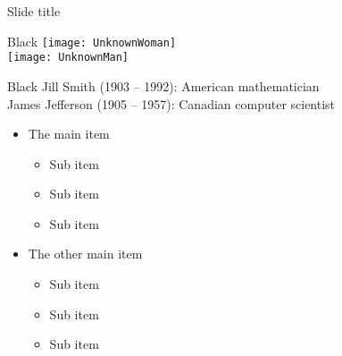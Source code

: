 \documentclass{MichiganTech}
\begin{document}
%
\begin{frame}[t]{Slide title}
  \vspace*{0.10in}
  \begin{reference}{108mm}{12mm}{Black}
    \texttt{[image: UnknownWoman]}\\
    \texttt{[image: UnknownMan]}
  \end{reference}
  \begin{reference}{4mm}{83mm}{Black}
    Jill Smith (1903 -- 1992): American mathematician\\
    James Jefferson (1905 -- 1957): Canadian computer scientist
  \end{reference}

  \begin{itemize}
    \item The main item
          \begin{itemize}
            \item Sub item
            \item Sub item
            \item Sub item
          \end{itemize}
    \pause
    \item The other main item
          \begin{itemize}
            \item Sub item
            \item Sub item
            \item Sub item
          \end{itemize}
  \end{itemize}
\end{frame}
\end{document}
